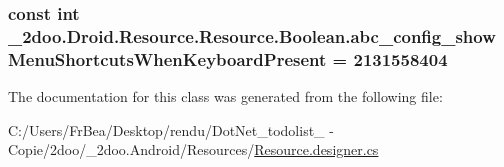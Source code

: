 \hypertarget{class__2doo_1_1_droid_1_1_resource_1_1_boolean_36f09a645e9d1b2111aa1f047d53dec3}{
\subsubsection[{abc\_\-config\_\-showMenuShortcutsWhenKeyboardPresent}]{\setlength{\rightskip}{0pt plus 5cm}const int \_\-2doo.Droid.Resource.Resource.Boolean.abc\_\-config\_\-showMenuShortcutsWhenKeyboardPresent = 2131558404}}
\label{class__2doo_1_1_droid_1_1_resource_1_1_boolean_36f09a645e9d1b2111aa1f047d53dec3}




The documentation for this class was generated from the following file:\begin{CompactItemize}
\item 
C:/Users/FrBea/Desktop/rendu/DotNet\_\-todolist\_ - Copie/2doo/\_\-2doo.Android/Resources/\hyperlink{_resource_8designer_8cs}{Resource.designer.cs}\end{CompactItemize}
